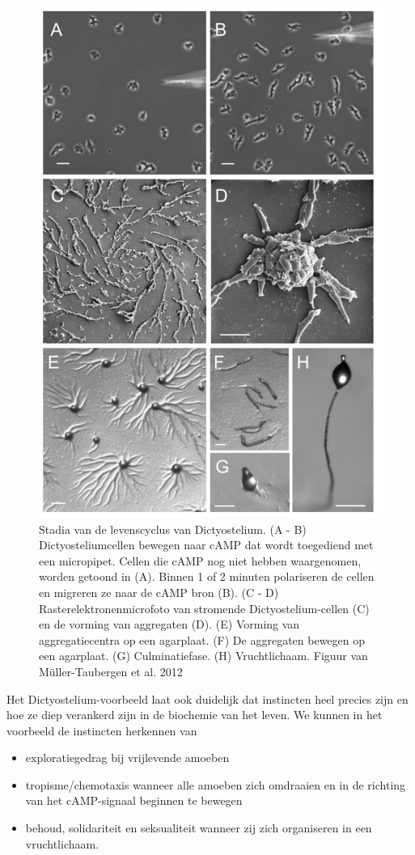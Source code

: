 \documentclass[
  11pt,
]{book}
\providecommand{\tightlist}{%
  \setlength{\itemsep}{0pt}\setlength{\parskip}{0pt}}
\begin{document}
\pagebreak

\begin{figure}

{\centering \includegraphics[width=0.6\linewidth]{./figs/Dictyostelida} 

}

\caption{Stadia van de levenscyclus van Dictyostelium. (A - B) Dictyosteliumcellen bewegen naar cAMP dat wordt toegediend met een micropipet. Cellen die cAMP nog niet hebben waargenomen, worden getoond in (A). Binnen 1 of 2 minuten polariseren de cellen en migreren ze naar de cAMP bron (B). (C - D) Rasterelektronenmicrofoto van stromende Dictyostelium-cellen (C) en de vorming van aggregaten (D). (E) Vorming van aggregatiecentra op een agarplaat. (F) De aggregaten bewegen op een agarplaat. (G) Culminatiefase. (H) Vruchtlichaam. Figuur van Müller-Taubergen et al. 2012}\label{fig:Dictyostelium}
\end{figure}

Het Dictyostelium-voorbeeld laat ook duidelijk dat instincten heel precies zijn en hoe ze diep verankerd zijn in de biochemie van het leven. We kunnen in het voorbeeld de instincten herkennen van

\begin{itemize}
\tightlist
\item
  exploratiegedrag bij vrijlevende amoeben
\item
  tropisme/chemotaxis wanneer alle amoeben zich omdraaien en in de richting van het cAMP-signaal beginnen te bewegen
\item
  behoud, solidariteit en seksualiteit wanneer zij zich organiseren in een vruchtlichaam.
\end{itemize}
\end{document}
